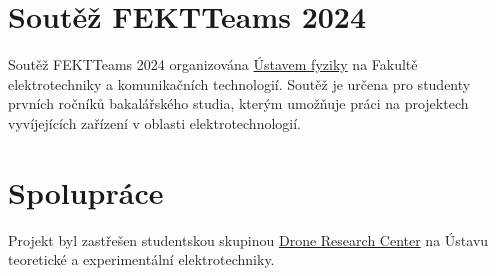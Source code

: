 \documentclass{article} %
\begin{document}
            \section{Soutěž FEKTTeams 2024}
                Soutěž FEKTTeams 2024 organizována \href{https://www.ufyz.fekt.vut.cz/}{Ústavem fyziky} na Fakultě elektrotechniky a komunikačních technologií. Soutěž je určena pro studenty prvních ročníků bakalářského studia, kterým umožňuje práci na projektech vyvíjejících zařízení v oblasti elektrotechnologií.
            \section{Spolupráce}    
                Projekt byl zastřešen studentskou skupinou \href{https://www.utee.fekt.vut.cz/drone-research-center}{Drone Research Center} na Ústavu teoretické a experimentální elektrotechniky.\\
                \vspace{1.5cm}
\end{document}
